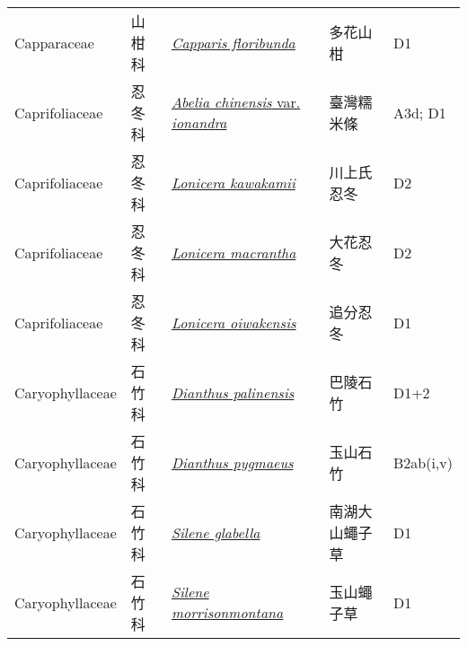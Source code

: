 {\begin{longtable}{L{2.5cm}L{2cm}L{5cm}L{2.5cm}L{3cm}}
    Capparaceae & 山柑科 & \href{http://www.theplantlist.org/tpl1.1/search?q=Capparis+floribunda}{\textit{Capparis floribunda} } & 多花山柑 & D1    \\
    Caprifoliaceae & 忍冬科 & \href{http://www.theplantlist.org/tpl1.1/search?q=Abelia+chinensis+var.+ionandra}{\textit{Abelia chinensis} var. \textit{ionandra} } & 臺灣糯米條 & A3d; D1    \\
    Caprifoliaceae & 忍冬科 & \href{http://www.theplantlist.org/tpl1.1/search?q=Lonicera+kawakamii}{\textit{Lonicera kawakamii} } & 川上氏忍冬 & D2    \\
    Caprifoliaceae & 忍冬科 & \href{http://www.theplantlist.org/tpl1.1/search?q=Lonicera+macrantha}{\textit{Lonicera macrantha} } & 大花忍冬 & D2    \\
    Caprifoliaceae & 忍冬科 & \href{http://www.theplantlist.org/tpl1.1/search?q=Lonicera+oiwakensis}{\textit{Lonicera oiwakensis} } & 追分忍冬 & D1    \\
    Caryophyllaceae & 石竹科 & \href{http://www.theplantlist.org/tpl1.1/search?q=Dianthus+palinensis}{\textit{Dianthus palinensis} } & 巴陵石竹 & D1+2    \\
    Caryophyllaceae & 石竹科 & \href{http://www.theplantlist.org/tpl1.1/search?q=Dianthus+pygmaeus}{\textit{Dianthus pygmaeus} } & 玉山石竹 & B2ab(i,v)    \\
    Caryophyllaceae & 石竹科 & \href{http://www.theplantlist.org/tpl1.1/search?q=Silene+glabella}{\textit{Silene glabella} } & 南湖大山蠅子草 & D1    \\
    Caryophyllaceae & 石竹科 & \href{http://www.theplantlist.org/tpl1.1/search?q=Silene+morrisonmontana}{\textit{Silene morrisonmontana} } & 玉山蠅子草 & D1    \\

\end{longtable}}
